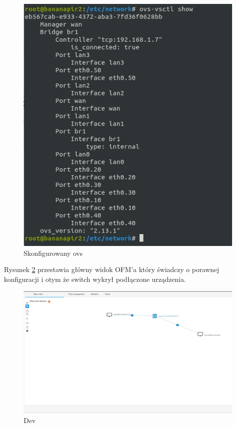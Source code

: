 \documentclass[12pt,a4paper,twoside]{article}
\begin{document}
 \begin{figure}[!h]
	\centering\includegraphics[width=1\textwidth]{ovs_show.jpg}
	\caption{Skonfigurowany ovs}
	\label{ovs}
\end{figure}

\newpage
Rysunek \ref{Dev} przestawia główny widok OFM'a który świadczy o porawnej konfiguracji i otym że switch wykrył podłączone urządzenia.  


\begin{figure} [!h]
	\centering\includegraphics[width=1\textwidth]{Dev.jpg}
	\caption{Dev}
	\label{Dev}
\end{figure}
\end{document}
